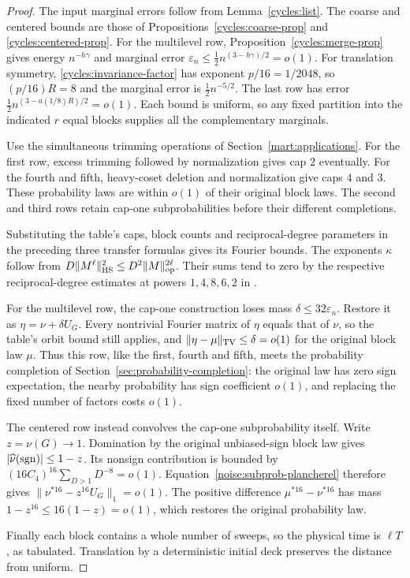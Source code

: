 \begin{proof}
The input marginal errors follow from Lemma~\ref{cycles:list}.
The coarse and centered bounds are those of
Propositions~\ref{cycles:coarse-prop} and \ref{cycles:centered-prop}.
For the multilevel row, Proposition~\ref{cycles:merge-prop} gives
energy $n^{-h\gamma}$ and marginal error
$\varepsilon_n\le\tfrac12n^{(3-h\gamma)/2}=o(1)$.
For translation symmetry, \eqref{cycles:invariance-factor} has exponent
$p/16=1/2048$, so $(p/16)R=8$ and the marginal error is
$\tfrac12n^{-5/2}$. The last row has error
$\tfrac12n^{(3-a(1/8)R)/2}=o(1)$.
Each bound is uniform, so any fixed partition into the indicated
$r$ equal blocks supplies all the complementary marginals.

Use the simultaneous trimming operations of
Section~\ref{mart:applications}. For the first row, excess trimming
followed by normalization gives cap $2$ eventually. For the fourth
and fifth, heavy-coset deletion and normalization give caps $4$ and
$3$. These probability laws are within $o(1)$ of their original block
laws. The second and third rows retain cap-one subprobabilities before
their different completions.

Substituting the table's caps, block counts and reciprocal-degree
parameters in the preceding three transfer formulas gives its Fourier
bounds. The exponents $\kappa$ follow from
$D\|M^\ell\|_{\mathrm{HS}}^2\le D^2\|M\|_{\mathrm{op}}^{2\ell}$.
Their sums tend to zero by the respective reciprocal-degree estimates
at powers $1,4,8,6,2$ in
\cite[Theorem~\ref*{l-l:degree-all-powers}]{partialFourier}.

For the multilevel row, the cap-one construction loses mass
$\delta\le32\varepsilon_n$. Restore it as $\eta=\nu+\delta U_G$.
Every nontrivial Fourier matrix of $\eta$ equals that of $\nu$, so
the table's orbit bound still applies, and
$\|\eta-\mu\|_{\mathrm{TV}}\le\delta=o(1)$ for the original block law $\mu$.
Thus this row, like the first, fourth and fifth, meets the probability
completion of Section~\ref{sec:probability-completion}: the original
law has zero sign expectation, the nearby probability has sign
coefficient $o(1)$, and replacing the fixed number of factors costs
$o(1)$.

The centered row instead convolves the cap-one subprobability itself.
Write $z=\nu(G)\to1$. Domination by the original unbiased-sign block
law gives $|\widehat\nu(\operatorname{sgn})|\le1-z$. Its nonsign contribution is
bounded by $(16C_4)^{16}\sum_{D>1}D^{-8}=o(1)$.
Equation~\eqref{noise:subprob-plancherel} therefore gives
$\|\nu^{*16}-z^{16}U_G\|_1=o(1)$. The positive difference
$\mu^{*16}-\nu^{*16}$ has mass $1-z^{16}\le16(1-z)=o(1)$,
which restores the original probability law.

Finally each block contains a whole number of sweeps, so the physical
time is $\ell T$, as tabulated. Translation by a deterministic initial
deck preserves the distance from uniform.
\end{proof}

